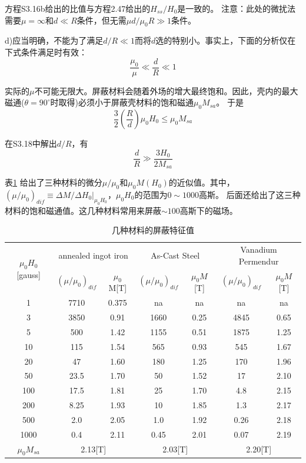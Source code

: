方程S3.16b给出的比值与方程2.47给出的$H_{ss}/H_0$是一致的。
注意：此处的微扰法需要$\mu=\infty$和$d\ll R$条件，但无需$\mu d/\mu_0 R \gg 1$条件。

d)应当明确，不能为了满足$d/R \ll 1$而将$d$选的特别小。事实上，下面的分析仅在下式条件满足时有效：
\begin{equation*}
\frac{\mu_0}{\mu} \ll \frac{d}{R} \ll 1 \tag{S3.17}
\end{equation*}

实际的$\mu$不可能无限大。屏蔽材料会随着外场的增大最终饱和。因此，壳内的最大磁通($\theta=90^\circ$时取得)必须小于屏蔽壳材料的饱和磁通$\mu_0 M_{sa}$。
于是
\begin{equation*}
\frac{3}{2}\left(\frac{R}{d}\right)\mu_0 H_0 \le \mu_0 M_{sa}  \tag{S3.18}
\end{equation*}

在S3.18中解出$d/R$，有
\begin{equation*}
\frac{d}{R}\gg \frac{3H_0}{2M_{sa}}  \tag{2.48}
\end{equation*}

表\ref{my-label} 给出了三种材料的微分$\mu/\mu_0$和$\mu_0M(H_0)$的近似值。其中，$(\mu/\mu_0)_{dif}\equiv \Delta M/ \Delta H_0 |_{\mu_0 H_0}$，$\mu_0 H_0$的范围为$0\sim 1000$高斯。
后面还给出了这三种材料的饱和磁通值。这几种材料常用来屏蔽$\sim 100$高斯下的磁场。

\begin{table}[]
\centering
\caption{几种材料的屏蔽特征值}
\label{my-label}
\begin{tabular}{|c|c|c|c|c|c|c|}
\hline
\multirow{2}{*}{$\mu_0 H_0$[gauss]} & \multicolumn{2}{c|}{annealed ingot iron} & \multicolumn{2}{c|}{As-Cast Steel} & \multicolumn{2}{c|}{Vanadium Permendur} \\ \cline{2-7}
&$ (\mu/\mu_0)_{dif} $ & $\mu_0 $M[T] & $(\mu/\mu_0)_{dif} $ &$ \mu_0 M$[T] &$ (\mu/\mu_0)_{dif} $ & $\mu_0 M$[T] \\ \hline
1 & 7710 & 0.375 & na & na & na & na \\ \hline
3 & 3850 & 0.91 & 1660 & 0.25 & 4845 & 0.65 \\ \hline
5 & 500 & 1.42 & 1155 & 0.51 & 1875 & 1.25 \\ \hline
10 & 115 & 1.54 & 565 & 0.93 & 545 & 1.67 \\ \hline
20 & 47 & 1.60 & 180 & 1.25 & 170 & 1.96 \\ \hline
50 & 23.5 & 1.70 & 50 & 1.52 & 17 & 2.10 \\ \hline
100 & 17.5 & 1.81 & 25 & 1.70 & 4.8 & 2.15 \\ \hline
200 & 8.25 & 1.93 & 10 & 1.85 & 1.3 & 2.17 \\ \hline
500 & 2.0 & 2.05 & 1.0 & 1.92 & 0.26 & 2.18 \\ \hline
1000 & 0.4 & 2.11 & 0.45 & 2.01 & 0.07 & 2.19 \\ \hline
$\mu_0 M_{sa} $ & \multicolumn{2}{c|}{2.13[T]} & \multicolumn{2}{c|}{2.03[T]} & \multicolumn{2}{c|}{2.20[T]} \\ \hline


\end{tabular}
\end{table}

